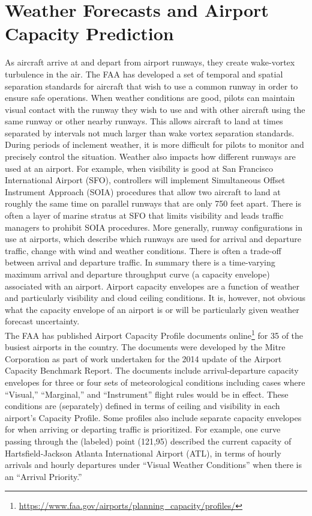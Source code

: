 \documentclass[12pt]{article}
\begin{document}
\section{Weather Forecasts and Airport Capacity Prediction}\label{Capacity}
	As aircraft arrive at and depart from airport runways, they create wake-vortex turbulence in the air.  The FAA has developed a set of temporal and spatial separation standards for aircraft that wish to use a common runway in order to ensure safe operations.  When weather conditions are good, pilots can maintain visual contact with the runway they wish to use and with other aircraft using the same runway or other nearby runways.  This allows aircraft to land at times separated by intervals not much larger than wake vortex separation standards.  During periods of inclement weather, it is more difficult for pilots to monitor and precisely control the situation.  Weather also impacts how different runways are used at an airport.  For example, when visibility is good at San Francisco International Airport (SFO), controllers will implement Simultaneous Offset Instrument Approach (SOIA) procedures that allow two aircraft to land at roughly the same time on parallel runways that are only 750 feet apart.  There is often a layer of marine stratus at SFO that limits visibility and leads traffic managers to prohibit SOIA procedures.  More generally, runway configurations in use at airports, which describe which runways are used for arrival and departure traffic, change with wind and weather conditions.  There is often a trade-off between arrival and departure traffic.  In summary there is a time-varying maximum arrival and departure throughput curve (a capacity envelope) associated with an airport.   Airport capacity envelopes are a function of weather and particularly visibility and cloud ceiling conditions.  It is, however, not obvious what the capacity envelope of an airport is or will be particularly given weather forecast uncertainty.\\
	\newline
	The FAA has published Airport Capacity Profile documents online\footnote{\url{https://www.faa.gov/airports/planning_capacity/profiles/}} for 35 of the busiest airports in the country. The documents were developed by the Mitre Corporation as part of work undertaken for the 2014 update of the Airport Capacity Benchmark Report.  The documents include arrival-departure capacity envelopes for three or four sets of meteorological conditions including cases where ``Visual,'' ``Marginal,'' and ``Instrument'' flight rules would be in effect. These conditions are (separately) defined in terms of ceiling and visibility in each airport's Capacity Profile. Some profiles also include separate capacity envelopes for when arriving or departing traffic is prioritized.  For example, one curve passing through the (labeled) point (121,95) described the current capacity of Hartsfield-Jackson Atlanta International Airport (ATL), in terms of hourly arrivals and hourly departures under ``Visual Weather Conditions'' when there is an ``Arrival Priority.''\\
\end{document}
